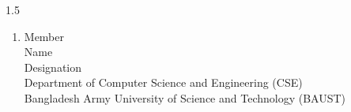 \begin{spacing}{1.5}

\begin{enumerate}

\vspace{.35in}
\item[4.] \textbf{\hrulefill} \hspace{6.9 cm}  Member \\
    Name \\
    Designation \\
    Department of Computer Science and Engineering (CSE) \\
    Bangladesh Army University of Science and Technology (BAUST)

\vspace{.35in}

\end{enumerate}

\vfill %
\hspace{\fill}\textbf{\hrulefill}
\end{spacing}
